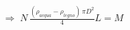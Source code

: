 \documentclass[preview]{standalone}
\begin{document}
\begin{align*}
\Rightarrow\; N\,\tfrac{(\rho_{acqua}-\rho_{legno})\,\pi D^2}{4}L = M
\end{align*}
\end{document}
